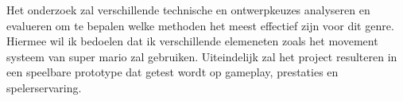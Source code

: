 Het onderzoek zal verschillende technische en ontwerpkeuzes analyseren en evalueren om te bepalen welke methoden het meest effectief zijn voor dit genre.
Hiermee wil ik bedoelen dat ik verschillende elemeneten zoals het movement systeem van super mario zal gebruiken. Uiteindelijk zal het project resulteren in een speelbare prototype dat getest wordt op gameplay, prestaties en spelerservaring.




